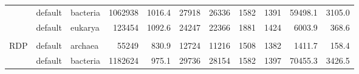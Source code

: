 \begin{table}[hb]
\begin{center}
\begin{tabular}{lllrr|rrrr|rr}
                & default  & bacteria & 1062938 & 1016.4 & 27918 & 26336 &  1582 &  1391 & 59498.1 &   3105.0 \\
                & default  & eukarya  &  123454 & 1092.6 & 24247 & 22366 &  1881 &  1424 &   6003.9 &    368.6 \\
& & & & & & & & & & \\ 
RDP             & default  & archaea  &   55249 &  830.9 & 12724 & 11216 &  1508 &  1382 &   1411.7 &    158.4 \\
                & default  & bacteria & 1182624 &  975.1 & 29736 & 28154 &  1582 &  1397 & 70455.3 &   3426.5 \\ %

\end{tabular}
\end{center}
\end{table}
